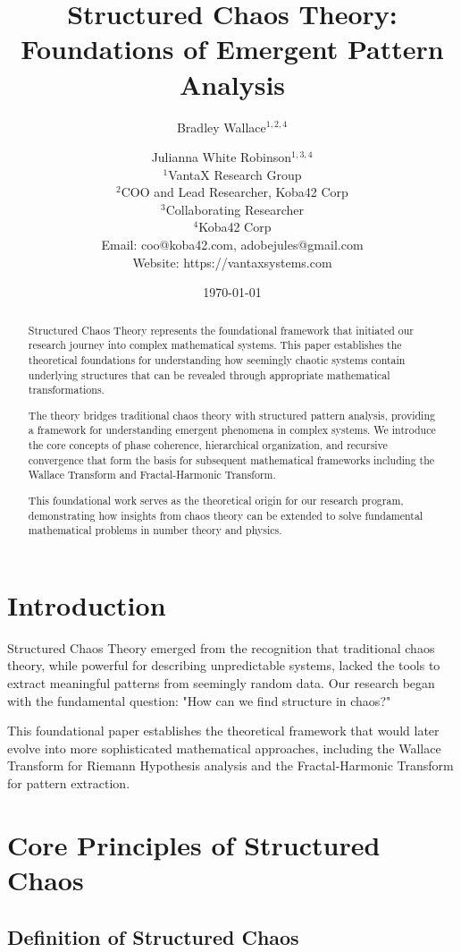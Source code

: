 \documentclass[12pt]{article}
\title{Structured Chaos Theory: Foundations of Emergent Pattern Analysis}
\author{
Bradley Wallace$^{1,2,4}$ \and Julianna White Robinson$^{1,3,4}$ \\
$^1$VantaX Research Group \\
$^2$COO and Lead Researcher, Koba42 Corp \\
$^3$Collaborating Researcher \\
$^4$Koba42 Corp \\
Email: coo@koba42.com, adobejules@gmail.com \\
Website: https://vantaxsystems.com
}
\date{\today}
\begin{document}
\maketitle

\begin{abstract}
Structured Chaos Theory represents the foundational framework that initiated our research journey into complex mathematical systems. This paper establishes the theoretical foundations for understanding how seemingly chaotic systems contain underlying structures that can be revealed through appropriate mathematical transformations.

The theory bridges traditional chaos theory with structured pattern analysis, providing a framework for understanding emergent phenomena in complex systems. We introduce the core concepts of phase coherence, hierarchical organization, and recursive convergence that form the basis for subsequent mathematical frameworks including the Wallace Transform and Fractal-Harmonic Transform.

This foundational work serves as the theoretical origin for our research program, demonstrating how insights from chaos theory can be extended to solve fundamental mathematical problems in number theory and physics.
\end{abstract}

\section{Introduction}

Structured Chaos Theory emerged from the recognition that traditional chaos theory, while powerful for describing unpredictable systems, lacked the tools to extract meaningful patterns from seemingly random data. Our research began with the fundamental question: "How can we find structure in chaos?"

This foundational paper establishes the theoretical framework that would later evolve into more sophisticated mathematical approaches, including the Wallace Transform for Riemann Hypothesis analysis and the Fractal-Harmonic Transform for pattern extraction.

\section{Core Principles of Structured Chaos}

\subsection{Definition of Structured Chaos}
\end{document}
